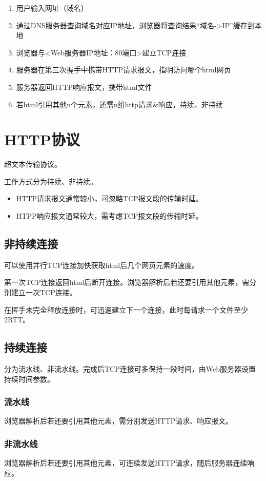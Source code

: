 \begin{enumerate}
    \item 用户输入网址（域名）
    \item 通过DNS服务器查询域名对应IP地址，浏览器将查询结果“域名->IP”缓存到本地
    \item 浏览器与<Web服务器IP地址：80端口>建立TCP连接
    \item 服务器在第三次握手中携带HTTP请求报文，指明访问哪个html网页
    \item 服务器返回HTTP响应报文，携带html文件
    \item 若html引用其他n个元素，还需n组http请求\&响应，持续、非持续
\end{enumerate}


\section{HTTP协议}
超文本传输协议。

工作方式分为持续、非持续。
\begin{itemize}
    \item HTTP请求报文通常较小，可忽略TCP报文段的传输时延。
    \item HTPP响应报文通常较大，需考虑TCP报文段的传输时延。
\end{itemize}

\subsection{非持续连接}
可以使用并行TCP连接加快获取html后几个网页元素的速度。

第一次TCP连接返回html后断开连接。浏览器解析后若还要引用其他元素，需分别建立一次TCP连接。

在挥手未完全释放连接时，可迅速建立下一个连接，此时每请求一个文件至少2RTT。


\subsection{持续连接}
分为流水线、非流水线。完成后TCP连接可多保持一段时间，由Web服务器设置持续时间参数。

\subsubsection{流水线}
浏览器解析后若还要引用其他元素，需分别发送HTTP请求、响应报文。


\subsubsection{非流水线}
浏览器解析后若还要引用其他元素，可连续发送HTTP请求，随后服务器连续响应。


